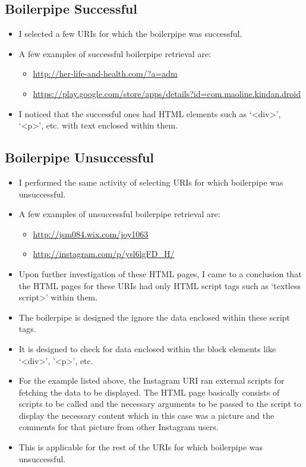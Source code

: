 \subsection{Boilerpipe Successful}
\begin{itemize}
\item I selected a few URIs for which the boilerpipe was successful.
\item A few examples of successful boilerpipe retrieval are:
	\begin{itemize}
	\item \url{http://her-life-and-health.com/?a=adm}
	\item \url{https://play.google.com/store/apps/details?id=com.maoline.kindan.droid}
	\end{itemize}
\item I noticed that the successful ones had HTML elements such as `\textless div\textgreater', `\textless p\textgreater', etc. with text enclosed within them.
\end{itemize}

\subsection{Boilerpipe Unsuccessful}
\begin{itemize}
\item I performed the same activity of selecting URIs for which boilerpipe was unsuccessful.
\item A few examples of unsuccessful boilerpipe retrieval are:
	\begin{itemize}
	\item \url{http://jsm084.wix.com/joy1063}
	\item \url{http://instagram.com/p/ysl6lgFD_H/}
	\end{itemize}
\item Upon further investigation of these HTML pages, I came to a conclusion that the HTML pages for these URIs had only HTML script tags such as `textless script\textgreater' within them.
\item The boilerpipe is designed the ignore the data enclosed within these script tags.
\item It is designed to check for data enclosed within the block elements like `\textless div\textgreater', '\textless p\textgreater', etc.
\item For the example listed above, the Instagram URI ran external scripts for fetching the data to be displayed. The HTML page basically consists of scripts to be called and the necessary arguments to be passed to the script to display the necessary content which in this case was a picture and the comments for that picture from other Instagram users.
\item This is applicable for the rest of the URIs for which boilerpipe was unsuccessful.
\end{itemize}

